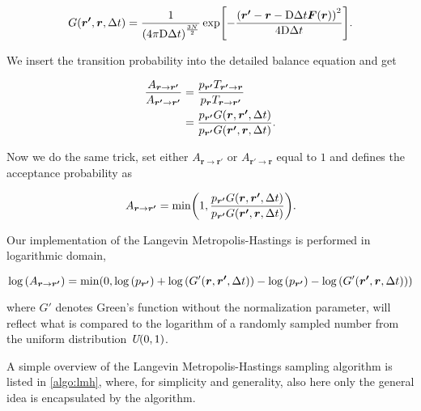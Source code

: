 \begin{equation}
    G\qty(\bm{r'}, \bm{r}, \Delta t) = \frac{1}{\qty(4\pi\mathrm{D}\Delta t)^{\frac{3N}{2}}}\exp[-\frac{\qty(\bm{r'}-\bm{r}-\mathrm{D}\Delta t\bm{F}\qty(\bm{r}))^2}{4\mathrm{D}\Delta t}].
\end{equation}

We insert the transition probability into the detailed balance equation and get 

\begin{align*}
    \frac{A_{\bm{r}\to\bm{r'}}}{A_{\bm{r'}\to\bm{r'}}} &= \frac{p_{\bm{r'}}T_{\bm{r'}\to\bm{r}}}{p_{\bm{r}}T_{\bm{r}\to\bm{r'}}} 
    \\
    &= \frac{p_{\bm{r'}}G\qty(\bm{r}, \bm{r'}, \Delta t)}{p_{\bm{r'}}G\qty(\bm{r'}, \bm{r}, \Delta t)}.
\end{align*}

Now we do the same trick, set either $A_{\bm{r}\to\bm{r'}}$ or $A_{\bm{r'}\to\bm{r}}$ equal to $1$ and defines the acceptance probability as 

\begin{equation}
    A_{\bm{r}\to\bm{r'}} = \mathrm{min}\qty(1, \frac{p_{\bm{r'}}G\qty(\bm{r}, \bm{r'}, \Delta t)}{p_{\bm{r'}}G\qty(\bm{r'}, \bm{r}, \Delta t)}).
\end{equation}

Our implementation of the Langevin Metropolis-Hastings is performed in logarithmic domain,  

\begin{equation}
    \log{\qty(A_{\bm{r}\to\bm{r'}})} = \mathrm{min}\qty(0, \log{\qty(p_{\bm{r'}})} + \log{\qty(G'\qty(\bm{r}, \bm{r'}, \Delta t))} - \log{\qty(p_{\bm{r'}})}-\log{\qty(G'\qty(\bm{r'}, \bm{r}, \Delta t))})
\end{equation}

where $G'$ denotes Green's function without the normalization parameter, will reflect what is compared to the logarithm of a randomly sampled number from the uniform distribution $\textit{U}\qty(0, 1)$. 

A simple overview of the Langevin Metropolis-Hastings sampling algorithm is listed in \autoref{algo:lmh}, where, for simplicity and generality, also here only the general idea is encapsulated by the algorithm. 

